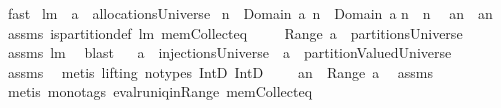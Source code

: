 \begin{isabellebody}
\isamarkupfalse%
\ fast%
\endisatagproof
{\isafoldproof}%
%
\isadelimproof
%
\endisadelimproof
\isanewline
\isanewline
{}\isamarkupfalse%
\ lm{}{}{\isacharcolon}\ \ {\isachardoublequoteopen}a\ {\isasymin}\ allocationsUniverse{\isachardoublequoteclose}\ \isanewline
{\isachardoublequoteopen}n{}\ {\isasymin}\ Domain\ a{\isachardoublequoteclose}\ {\isachardoublequoteopen}n{}\ {\isasymin}\ Domain\ a{\isachardoublequoteclose}\isanewline
{\isachardoublequoteopen}n{}\ {\isasymnoteq}\ n{}{\isachardoublequoteclose}\ \isanewline
{}\ {\isachardoublequoteopen}a{\isacharcomma}{\isacharcomma}n{}\ {\isasyminter}\ a{\isacharcomma}{\isacharcomma}n{}{\isacharequal}{\isacharbraceleft}{\isacharbraceright}{\isachardoublequoteclose}%
\isadelimproof
\ %
\endisadelimproof
%
\isatagproof
{}\isamarkupfalse%
\ assms\ is{\isacharunderscore}partition{\isacharunderscore}def\ lm{}{}\ mem{\isacharunderscore}Collect{\isacharunderscore}eq\ \isanewline
{}\isamarkupfalse%
\ {\isacharminus}\ \isamarkupfalse%
\ {\isachardoublequoteopen}Range\ a\ {\isasymin}\ partitionsUniverse{\isachardoublequoteclose}\ \isamarkupfalse%
\ assms\ lm{}{}\ \isamarkupfalse%
\ blast\isanewline
{}\isamarkupfalse%
\ \isamarkupfalse%
\ {\isachardoublequoteopen}a\ {\isasymin}\ injectionsUniverse\ {\isacharampersand}\ a\ {\isasymin}\ partitionValuedUniverse{\isachardoublequoteclose}\ \isamarkupfalse%
\ assms\ \isamarkupfalse%
\ {\isacharparenleft}metis\ {\isacharparenleft}lifting{\isacharcomma}\ no{\isacharunderscore}types{\isacharparenright}\ IntD{}\ IntD{}{\isacharparenright}\isanewline
{}\isamarkupfalse%
\ \isamarkupfalse%
\ \isamarkupfalse%
\ {\isachardoublequoteopen}a{\isacharcomma}{\isacharcomma}n{}\ {\isasymin}\ Range\ a{\isachardoublequoteclose}\ \isamarkupfalse%
\ assms\ \isanewline
{}\isamarkupfalse%
\ {\isacharparenleft}metis\ {\isacharparenleft}mono{\isacharunderscore}tags{\isacharparenright}\ eval{\isacharunderscore}runiq{\isacharunderscore}in{\isacharunderscore}Range\ mem{\isacharunderscore}Collect{\isacharunderscore}eq{\isacharparenright}\isanewline
{}\isamarkupfalse%
\ \isamarkupfalse%

\end{isabellebody}
